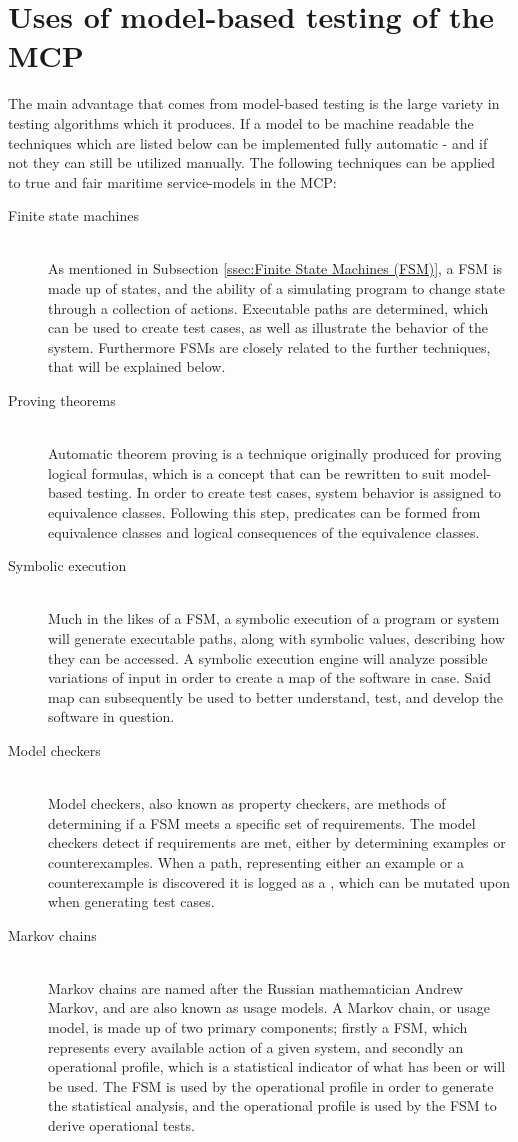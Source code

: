 \section{Uses of model-based testing of the MCP}
The main advantage that comes from model-based testing is the large variety in testing algorithms which it produces. If a model to be machine readable the techniques which are listed below can be implemented fully automatic - and if not they can still be utilized manually. The following techniques can be applied to true and fair maritime service-models in the MCP: \newpage
\begin{description}
	\item[Finite state machines]\ \\
		As mentioned in Subsection \ref{ssec:Finite State Machines (FSM)}, a FSM is made up of states, and the ability of a simulating program to change state through a collection of actions. Executable paths are determined, which can be used to create test cases, as well as illustrate the behavior of the system. Furthermore FSMs are closely related to the further techniques, that will be explained below.
	\item[Proving theorems]\ \\
		Automatic theorem proving is a technique originally produced for proving logical formulas, which is a concept that can be rewritten to suit model-based testing. In order to create test cases, system behavior is assigned to equivalence classes. Following this step, predicates can be formed from equivalence classes and logical consequences of the equivalence classes. 
	\item[Symbolic execution]\ \\
		Much in the likes of a FSM, a symbolic execution of a program or system will generate executable paths, along with symbolic values, describing how they can be accessed. A symbolic execution engine will analyze possible variations of input in order to create a map of the software in case. Said map can subsequently be used to better understand, test, and develop the software in question.
	\item[Model checkers]\ \\
		Model checkers, also known as property checkers, are methods of determining if a FSM meets a specific set of requirements. The model checkers detect if requirements are met, either by determining examples or counterexamples. When a path, representing either an example or a counterexample is discovered it is logged as a , which can be mutated upon when generating test cases.
	\item[Markov chains]\ \\
		Markov chains are named after the Russian mathematician Andrew Markov, and are also known as usage models. A Markov chain, or usage model, is made up of two primary components; firstly a FSM, which represents every available action of a given system, and secondly an operational profile, which is a statistical indicator of what has been or will be used. The FSM is used by the operational profile in order to generate the statistical analysis, and the operational profile is used by the FSM to derive operational tests.
\end{description}
